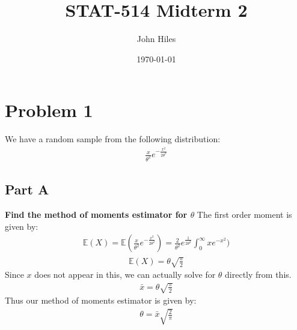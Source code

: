 \documentclass{article}
\title{STAT-514 Midterm 2}
\author{John Hiles}
\date\today
\begin{document}
\maketitle %


\section*{Problem 1}
We have a random sample from the following distribution:
\begin{align*}
\frac{x}{\theta^2} e^{-\frac{x^2}{2\theta^2}}
\end{align*}
\subsection*{Part A}
\textbf{Find the method of moments estimator for $\theta$}
The first order moment is given by:
\begin{align*}
\mathbb{E}(X) = \mathbb{E}(\frac{x}{\theta^2} e^{-\frac{x^2}{2\theta^2}}) = \frac{2}{\theta^2} e^{\frac{1}{2\theta^2}} \int_{0}^{\infty} x e^{-x^2})
\end{align*}
\begin{align*}
\mathbb{E}(X) = \theta \sqrt{\frac{\pi}{2}}
\end{align*}
Since $x$ does not appear in this, we can actually solve for $\theta$ directly from this.
\begin{align*}
\bar{x} = \theta \sqrt{\frac{\pi}{2}} 
\end{align*}
Thus our method of moments estimator is given by:
\begin{align*}
\boxed{ \theta = \bar{x}\sqrt{\frac{2}{\pi}} }
\end{align*}
\end{document}
